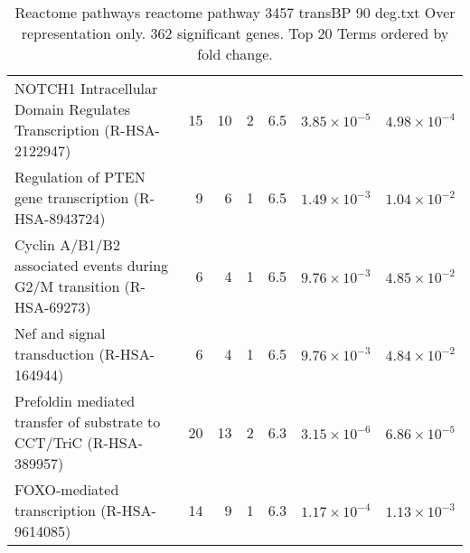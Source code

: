 \begin{table}[ht]
\begin{adjustbox}{width=\textwidth}
\begin{tabular}{lrrrrrr}
  NOTCH1 Intracellular Domain Regulates Transcription (R-HSA-2122947) & 15 & 10 & 2 & 6.5 & $3.85 \times 10^{-5}$ & $4.98 \times 10^{-4}$ \\ 
  Regulation of PTEN gene transcription (R-HSA-8943724) & 9 & 6 & 1 & 6.5 & $1.49 \times 10^{-3}$ & $1.04 \times 10^{-2}$ \\ 
  Cyclin A/B1/B2 associated events during G2/M transition (R-HSA-69273) & 6 & 4 & 1 & 6.5 & $9.76 \times 10^{-3}$ & $4.85 \times 10^{-2}$ \\ 
  Nef and signal transduction (R-HSA-164944) & 6 & 4 & 1 & 6.5 & $9.76 \times 10^{-3}$ & $4.84 \times 10^{-2}$ \\ 
  Prefoldin mediated transfer of substrate  to CCT/TriC (R-HSA-389957) & 20 & 13 & 2 & 6.3 & $3.15 \times 10^{-6}$ & $6.86 \times 10^{-5}$ \\ 
  FOXO-mediated transcription (R-HSA-9614085) & 14 & 9 & 1 & 6.3 & $1.17 \times 10^{-4}$ & $1.13 \times 10^{-3}$ \\ 
   \hline
\end{tabular}
\end{adjustbox}
\caption{Reactome pathways reactome pathway 3457 transBP 90 deg.txt Over representation only. 362 significant genes. Top 20 Terms ordered by fold change. } 
\label{tab:Reactome pathways reactome pathway 3457 transBP 90 deg.txt Over representation only. 362 significant genes. Top 20 Terms ordered by fold change. }
\end{table}



